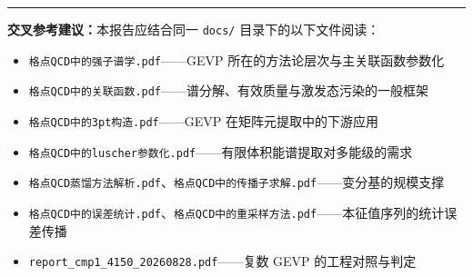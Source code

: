 \documentclass[12pt,a4paper]{ctexart}
\theoremstyle{definition}
\begin{document}
\vspace{0.5cm}
\noindent\rule{\textwidth}{0.5pt}
\small
\textbf{交叉参考建议：}本报告应结合同一 \texttt{docs/} 目录下的以下文件阅读：
\begin{itemize}[nosep]
    \item \texttt{格点QCD中的强子谱学.pdf}——GEVP 所在的方法论层次与主关联函数参数化
    \item \texttt{格点QCD中的关联函数.pdf}——谱分解、有效质量与激发态污染的一般框架
    \item \texttt{格点QCD中的3pt构造.pdf}——GEVP 在矩阵元提取中的下游应用
    \item \texttt{格点QCD中的luscher参数化.pdf}——有限体积能谱提取对多能级的需求
    \item \texttt{格点QCD蒸馏方法解析.pdf}、\texttt{格点QCD中的传播子求解.pdf}——变分基的规模支撑
    \item \texttt{格点QCD中的误差统计.pdf}、\texttt{格点QCD中的重采样方法.pdf}——本征值序列的统计误差传播
    \item \texttt{report\_cmp1\_4150\_20260828.pdf}——复数 GEVP 的工程对照与判定
\end{itemize}
\end{document}

